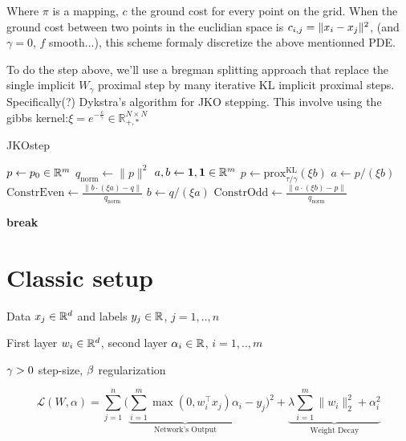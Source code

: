 Where $\pi$ is a mapping, $c$ the ground cost for every point on the grid. When the ground cost between two points in the euclidian space is $c_{i,j} = \lVert x_i- x_j\rVert^2$, (and $\gamma=0$, $f$ smooth...), this scheme formaly discretize the above mentionned PDE.

To do the step above, we'll use a bregman splitting approach that replace the single implicit $W_\gamma$ proximal step by many iterative KL implicit proximal steps. Specifically(?) Dykstra's algorithm for JKO stepping. This involve using the gibbs kernel:$\xi = e^{-\frac{c}{\gamma}} \in \mathbb{R}^{N \times N}_{+, \ast}$


\begin{algorithm}
\caption{JKOstep}
\begin{algorithmic}[1]
\State $p \gets p_0 \in \mathbb{R}^m$
\State $q_{\text{norm}} \gets \lVert p \rVert^2$
\State $a, b \gets \mathbf{1}, \mathbf{1} \in \mathbb{R}^m$ 
\State $p \gets \text{prox}^{\text{KL}}_{\tau/\gamma}(\xi b)$
    \State $a \gets p / (\xi b)$
    \State $\text{ConstrEven} \gets \frac{\lVert b \cdot (\xi a) - q \rVert}{q_{\text{norm}}}$
    \State $b \gets q / (\xi a)$
    \State $\text{ConstrOdd} \gets \frac{\lVert a \cdot (\xi b) - p \rVert}{q_{\text{norm}}}$
    
        \State \textbf{break}
    \EndIf
\EndFor
\end{algorithmic}
\end{algorithm}

\section{Classic setup}

Data $x_j \in \mathbb{R}^d$ and labels $y_j \in \mathbb{R}$, $j=1,..,n$

First layer $w_i \in \mathbb{R}^d$, second layer $\alpha_i \in \mathbb{R}$, $i=1,..,m$

$\gamma>0$ step-size, $\beta$ regularization

\begin{equation}
	 \mathcal{L}(W, \alpha) = \sum_{j=1}^n \bigg( \underbrace{\sum_{i=1}^m \max(0, w_i^\top x_j) \alpha_i}_{\text{Network's Output}} - y_j \bigg)^2 + \underbrace{\lambda \sum_{i=1}^m \| w_i \|^2_2 + \alpha_i^2}_{\text{Weight Decay}}
\end{equation}


